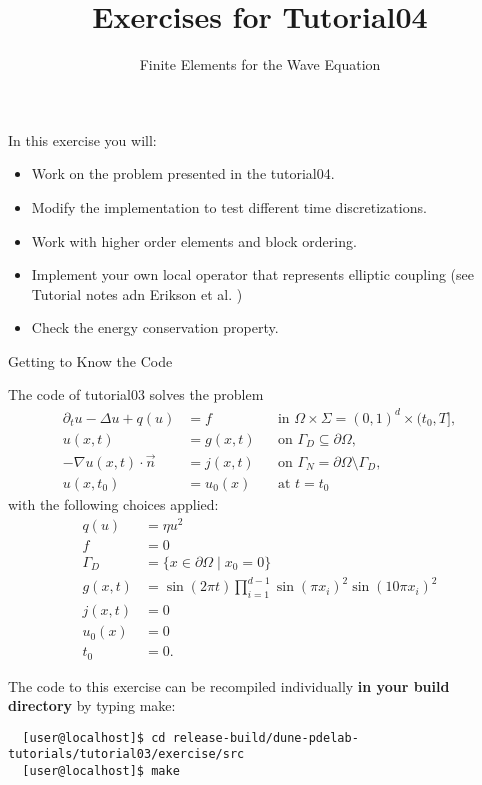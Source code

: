 \documentclass[12pt,a4paper]{article}
\title{\textbf{Exercises for Tutorial04}}
\subtitle{Finite Elements for the Wave  Equation}
\begin{document}
\exerciseheader

In this exercise you will:
\begin{itemize}
\item Work on the problem presented in the tutorial04.
\item Modify the implementation to test different time discretizations. 
\item Work with higher order elements and block ordering.
\item Implement your own local operator that represents elliptic coupling (see Tutorial notes adn Erikson et al. )
\item Check the energy conservation property.
\end{itemize}

\begin{Exercise}{Getting to Know the Code}

  \lstset{language=bash}

  The code of tutorial03 solves the problem
  \begin{align}
    \partial_t u-\Delta u+q(u) &= f && \text{in }\Omega\times\Sigma =
    (0,1)^d \times (t_0, T], \\
    u(x,t) & =g(x,t) && \text{on }\Gamma_D\subseteq\partial\Omega, \\
    -\nabla u(x,t) \cdot \vec{n} &= j(x,t) &&
    \text{on }\Gamma_N=\partial\Omega\setminus\Gamma_D, \\
    u(x,t_0)&=u_0(x) && \text{at } t=t_0
  \end{align}
  with the following choices applied:
  \begin{align}
    \label{ch1:first}
    q(u) &= \eta u^2 \\
    f &= 0 \\
    \Gamma_D &= \{x \in\partial\Omega \mid x_0 = 0 \} \\
    g(x,t) &= \sin(2\pi t) \prod_{i=1}^{d-1} \sin(\pi x_i)^2
    \sin(10\pi x_i)^2\\
    j(x,t) &= 0 \\
    u_0(x) &= 0 \\
    \label{ch1:last}
    t_0&=0 .
  \end{align}

  The code to this exercise can be recompiled individually \textbf{in
    your build directory} by typing make:
  \begin{lstlisting}
  [user@localhost]$ cd release-build/dune-pdelab-tutorials/tutorial03/exercise/src
  [user@localhost]$ make
  \end{lstlisting}


\end{Exercise}
\end{document}
